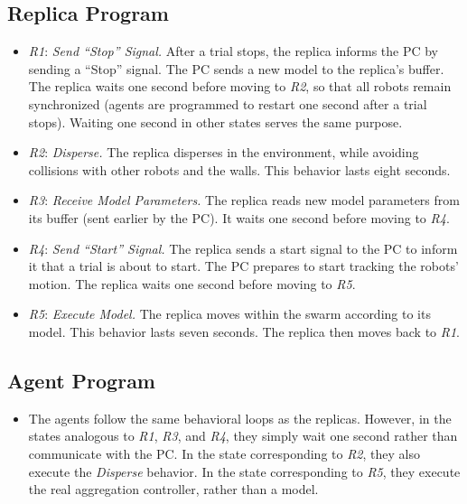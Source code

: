 \subsection{Replica Program}
\begin{itemize}

\item \textit{R1}: \textit{Send ``Stop'' Signal.} After a trial stops, the replica informs the PC by sending a ``Stop'' signal. 
The PC sends a new model to the replica's buffer.
The replica waits one second before moving to \textit{R2}, so that all robots remain synchronized (agents are programmed to restart one second after a trial stops). Waiting one second in other states serves the same purpose.

\item\textit{R2}: \textit{Disperse.} The replica disperses in the environment, while avoiding collisions with other robots and the walls. This behavior lasts eight seconds.

\item\textit{R3}: \textit{Receive Model Parameters.} The replica reads new model parameters from its buffer (sent earlier by the PC). It waits one second before moving to \textit{R4}.

\item\textit{R4}: \textit{Send ``Start'' Signal.} The replica sends a start signal to the PC to inform it that a trial is about to start. The PC prepares to start tracking the robots' motion. The replica waits one second before moving to \textit{R5}.

\item\textit{R5}: \textit{Execute Model.} The replica moves within the swarm according to its model. This behavior lasts seven seconds. The replica then moves back to \textit{R1}.
\end{itemize}

\subsection{Agent Program}
\begin{itemize}
\item The agents follow the same behavioral loops as the replicas. However, in the states analogous to \textit{R1}, \textit{R3}, and \textit{R4}, they simply wait one second rather than communicate with the PC. In the state corresponding to \textit{R2}, they also execute the \textit{Disperse} behavior. In the state corresponding to \textit{R5}, they execute the real aggregation controller, rather than a model.
\end{itemize}

